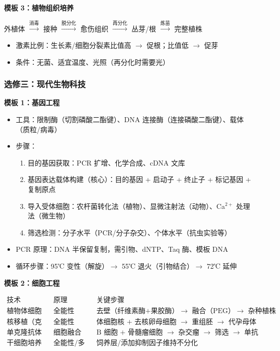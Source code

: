\textbf{模板 3：植物组织培养}

外植体 $\xrightarrow{\text{消毒}}$ 接种 $\xrightarrow{\text{脱分化}}$ 愈伤组织 $\xrightarrow{\text{再分化}}$ 丛芽/根 $\xrightarrow{\text{炼苗}}$ 完整植株

\begin{itemize}
  \item 激素比例：生长素/细胞分裂素比值高 $\to$ 促根；比值低 $\to$ 促芽
  \item 条件：无菌、适宜温度、光照（再分化时需要光）
\end{itemize}

\subsubsection{选修三：现代生物科技}

\textbf{模板 1：基因工程}

\begin{itemize}
  \item 工具：限制酶（切割磷酸二酯键）、DNA 连接酶（连接磷酸二酯键）、载体（质粒/病毒）
  \item 步骤：
  \begin{enumerate}
    \item 目的基因获取：PCR 扩增、化学合成、cDNA 文库
    \item 基因表达载体构建（核心）：目的基因 + 启动子 + 终止子 + 标记基因 + 复制原点
    \item 导入受体细胞：农杆菌转化法（植物）、显微注射法（动物）、Ca$^{2+}$ 处理法（微生物）
    \item 筛选检测：分子水平（PCR/分子杂交）、个体水平（抗虫实验等）
  \end{enumerate}
  \item PCR 原理：DNA 半保留复制，需引物、dNTP、Taq 酶、模板 DNA
  \item 循环步骤：95℃ 变性（解旋）$\to$ 55℃ 退火（引物结合）$\to$ 72℃ 延伸
\end{itemize}

\textbf{模板 2：细胞工程}

\[
\begin{array}{c|c|c}
\text{技术} & \text{原理} & \text{关键步骤} \\ \hline
\text{植物体细胞杂交} & \text{全能性} & \text{去壁（纤维素酶+果胶酶）$\to$ 融合（PEG）$\to$ 杂种植株} \\
\text{核移植（克隆）} & \text{全能性} & \text{体细胞核 + 去核卵母细胞 $\to$ 重组胚 $\to$ 代孕母体} \\
\text{单克隆抗体} & \text{细胞融合} & \text{B 细胞 + 骨髓瘤细胞 $\to$ 杂交瘤 $\to$ 筛选 $\to$ 单抗} \\
\text{干细胞培养} & \text{全能性/多能性} & \text{饲养层/添加抑制因子维持不分化}
\end{array}
\]

